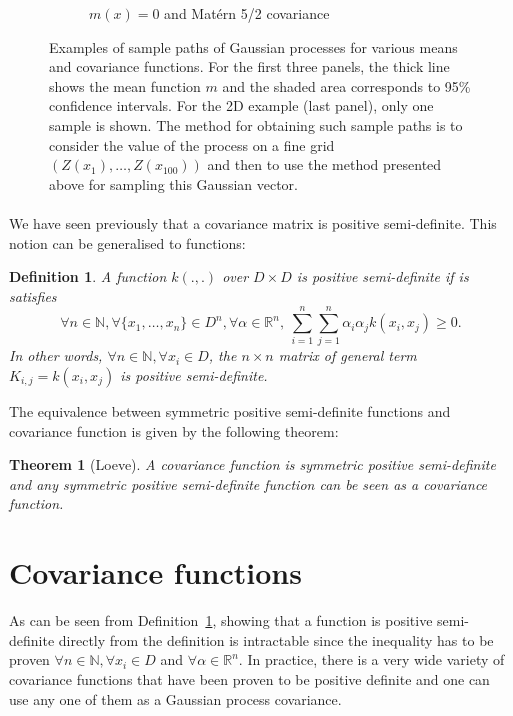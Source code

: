 \documentclass[twoside,openright]{report}
\newtheorem{definition}{Definition}
\newtheorem{theorem}{Theorem}
\begin{document}
\begin{figure}
\begin{subfigure}[t]{0.34\textwidth}
                \caption{$m(x) = 0$ and Mat\'ern 5/2 covariance}
        \end{subfigure}%
        \caption{Examples of sample paths of Gaussian processes for various means and covariance functions. For the first three panels, the thick line shows the mean function $m$ and the shaded area corresponds to 95\% confidence intervals. For the 2D example (last panel), only one sample is shown. The method for obtaining such sample paths is to consider the value of the process on a fine grid $(Z(x_1), \dots,Z(x_{100}))$ and then to use the method presented above for sampling this Gaussian vector.}
        \label{fig:GPsample}
\end{figure}

\paragraph{}
We have seen previously that a covariance matrix is positive semi-definite. This notion can be generalised to functions: 
\begin{definition}
\label{def:pdf}
	A function $k(.,.)$ over $D \times D$ is positive semi-definite if is satisfies
	\begin{equation*}
		\forall n \in \mathds{N}, \forall \{x_1,\dots,x_n\} \in D^n, \forall \alpha \in \mathds{R}^n,\  \sum_{i=1}^n \sum_{j=1}^n \alpha_i \alpha_j k(x_i,x_j) \geq 0.
	\end{equation*}
	In other words, $\forall n \in \mathds{N}, \forall x_i \in D$, the $n \times n$ matrix of general term $K_{i,j} = k(x_i,x_j)$ is positive semi-definite.
\end{definition}
The equivalence between symmetric positive semi-definite functions and covariance function is given by the following theorem:
\begin{theorem}[Loeve]
\label{thm:loeve}
	A covariance function is symmetric positive semi-definite and any symmetric positive semi-definite function can be seen as a covariance function. 
\end{theorem}

\section{Covariance functions}
\label{sec:kernels}
As can be seen from Definition~\ref{def:pdf}, showing that a function is positive semi-definite directly from the definition is intractable since the inequality has to be proven $\forall n \in \mathds{N}, \forall x_i \in D$ and $\forall \alpha \in \mathds{R}^n$. In practice, there is a very wide variety of covariance functions that have been proven to be positive definite and one can use any one of them as a Gaussian process covariance.
\end{document}
